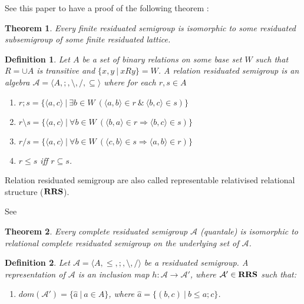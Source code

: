 \documentclass[a4paper]{article}
\theoremstyle{defin}
\newtheorem{defin}{Definition}
\theoremstyle{theorem}
\newtheorem{theorem}{Theorem}
\theoremstyle{prop}
\theoremstyle{lemma}
\theoremstyle{ex}
\theoremstyle{col}
\theoremstyle{claim}
\begin{document}
See this paper to have a proof of the following theorem \cite{goldblatt2006kripke}:

\begin{theorem}
  Every finite residuated semigroup is isomorphic to some residuated subsemigroup of some finite residuated lattice.
\end{theorem}


\begin{defin} \label{rrs}
  Let $A$ be a set of binary relations on some base set $W$ such that $R = \cup A$ is transitive and $\{ x, y \: | \: x R y \} = W$. A relation residuated semigroup is an algebra $\mathcal{A} = \langle A, ;, \setminus, /, \subseteq \rangle$ where for each $r, s \in A$
  \begin{enumerate}
    \item $r ; s = \{ \langle a, c \rangle \: | \: \exists b \in W \: (\langle a, b \rangle \in r \: \& \: \langle b, c \rangle \in s) \}$
    \item $r \setminus s = \{ \langle a, c \rangle \: | \: \forall b \in W \: (\langle b, a \rangle \in r \Rightarrow \langle b, c \rangle \in s)\}$
    \item $r / s = \{ \langle a, c \rangle \: | \: \forall b \in W \: (\langle c, b \rangle \in s \Rightarrow \langle a, b \rangle \in r)\}$
    \item $r \leq s$ iff $r \subseteq s$.
  \end{enumerate}
\end{defin}
Relation residuated semigroup are also called representable relativised relational structure (${\bf RRS}$).

See \cite{brown1993representation}
\begin{theorem}
  Every complete residuated semigroup $\mathcal{A}$ (quantale) is isomorphic to relational complete residuated semigroup on the underlying set of $\mathcal{A}$.
\end{theorem}

\begin{defin}
  Let $\mathcal{A} = \langle A, \leq, ;, \setminus, / \rangle$ be a residuated semigroup. A representation of $\mathcal{A}$ is an inclusion map $h : \mathcal{A} \to \mathcal{A}'$,
  where $\mathcal{A}' \in {\bf RRS}$ such that:
  \begin{enumerate}
    \item $dom(\mathcal{A}') = \{ \hat{a} \: | \: a \in A\}$, where $\hat{a} = \{ (b, c) \: | \: b \leq a ; c \}$.
  \end{enumerate}
\end{defin}
\end{document}
